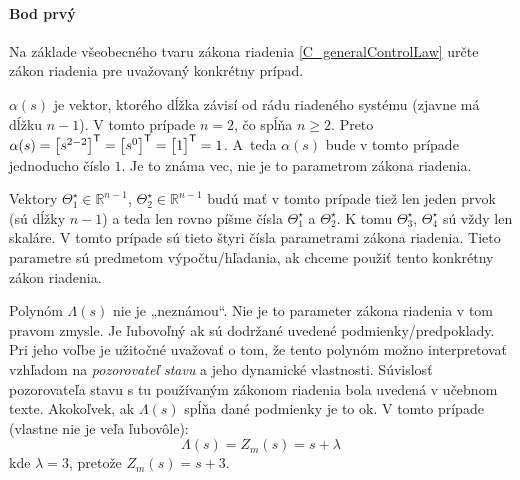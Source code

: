 \documentclass[a4paper, 10pt, ]{article}
\begin{document}
\paragraph{Bod prvý}

\smallskip

{\color{gray}

Na základe všeobecného tvaru zákona riadenia \eqref{C_generalControlLaw} určte zákon riadenia pre uvažovaný konkrétny prípad.

}

\smallskip


\noindent
$\alpha(s)$ je vektor, ktorého dĺžka závisí od rádu riadeného systému (zjavne má dĺžku $n-1$). V tomto prípade $n = 2$, čo spĺňa $n\geq 2$. Preto $\alpha(s) = \begin{bmatrix} s^{2-2} \end{bmatrix}^{\mathsf{T}} = \begin{bmatrix} s^{0} \end{bmatrix}^{\mathsf{T}} = \begin{bmatrix} 1 \end{bmatrix}^{\mathsf{T}} = 1$. A~teda $\alpha(s)$ bude v tomto prípade jednoducho číslo $1$. Je to známa vec, nie je to parametrom zákona riadenia.

Vektory $\Theta_1^\star \in \mathbb{R}^{n-1}$, $\Theta_2^\star \in \mathbb{R}^{n-1}$ budú mať v tomto prípade tiež len jeden prvok (sú dĺžky $n-1$) a teda len rovno píšme čísla $\Theta_1^\star$ a $\Theta_2^\star$. K tomu $\Theta_3^\star$, $\Theta_4^\star$ sú vždy len skaláre. V tomto prípade sú tieto štyri čísla parametrami zákona riadenia. Tieto parametre sú predmetom výpočtu/hľadania, ak chceme použiť tento konkrétny zákon riadenia.

Polynóm $\Lambda(s)$ nie je „neznámou“. Nie je to parameter zákona riadenia v tom pravom zmysle. Je ľubovoľný ak sú dodržané uvedené podmienky/predpoklady. Pri jeho voľbe je užitočné uvažovať o tom, že tento polynóm možno interpretovať vzhľadom na \emph{pozorovateľ stavu} a jeho dynamické vlastnosti. Súvislosť pozorovateľa stavu s tu používaným zákonom riadenia bola uvedená v učebnom texte. Akokoľvek, ak $\Lambda(s)$ spĺňa dané podmienky je to ok. V tomto prípade (vlastne nie je veľa ľubovôle):
\begin{equation}
    \Lambda(s) = Z_m(s) = s + \lambda
\end{equation}
kde $\lambda = 3$, pretože $Z_m(s) = s + 3$.
\end{document}
